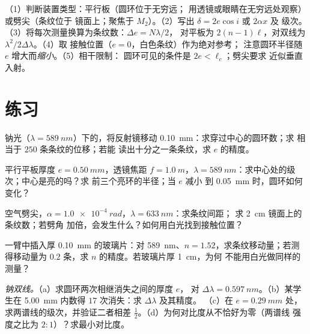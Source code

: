 \begin{method}[使用迈克耳孙干涉仪]\label{met:b2:michelson:method}
（1）判断装置类型：平行板（圆环位于无穷远；
用透镜或眼睛在无穷远处观察）或劈尖（条纹位于
镜面上；聚焦于 $M_2$）。（2）写出 $\delta = 2e\cos i$ 或 $2\alpha x$ 及
级次。（3）将每次测量换算为条纹数：$\Delta e = N\lambda/2$，
对平板为 $2(n - 1)\ell$，对双线为 $\lambda^2/2\Delta\lambda$。（4）取
接触位置（$e = 0$，白色条纹）作为绝对参考；
注意圆环半径随 $e$ 增大而\emph{缩小}。（5）相干限制：
圆环可见的条件是 $2e < \ell_c$；劈尖要求
近似垂直入射。
\end{method}

\section{练习}

\begin{exercise}[$\star$]\label{exo:b2:michelson:1}
钠光（$\lambda = \qty{589}{nm}$）下的，将反射镜移动
\qty{0.10}{mm}：求穿过中心的圆环数；求
相当于 $250$ 条条纹的位移；若能
读出十分之一条条纹，求 $e$ 的精度。
\end{exercise}

\begin{exercise}[$\star$]\label{exo:b2:michelson:2}
平行平板厚度 $e = \qty{0.50}{mm}$，透镜焦距 $f = \qty{1.0}{m}$，$\lambda =
\qty{589}{nm}$：求中心处的级次；中心是亮的吗？求
前三个亮环的半径；当 $e$ 减小
到 \qty{0.05}{mm} 时，圆环如何变化？
\end{exercise}

\begin{exercise}[$\star$]\label{exo:b2:michelson:3}
空气劈尖，$\alpha = \qty{1.0e-4}{rad}$，$\lambda = \qty{633}{nm}$：求条纹间距；
求 \qty{2}{cm} 镜面上的条纹数；若劈角
加倍，会发生什么？如何用白光找到接触位置？
\end{exercise}

\begin{exercise}[$\star$]\label{exo:b2:michelson:4}
一臂中插入厚 \qty{0.10}{mm} 的玻璃片：对
\qty{589}{nm}、$n = 1.52$，求条纹移动量；若测得移动量为 $0.2$ 条，求
$n$ 的精度。若玻璃片厚 \qty{1}{cm}，为何
不能用白光做同样的测量？
\end{exercise}

\begin{exercise}[$\star\star$]\label{exo:b2:michelson:5}
\emph{钠双线。}（a）求圆环两次相继消失之间的厚度 $e$，
对 $\Delta\lambda = \qty{0.597}{nm}$。（b）某学生在
\qty{5.00}{mm} 内数得 $17$ 次消失：求 $\Delta\lambda$ 及其精度。
（c）在 $e = \qty{0.29}{mm}$ 处，求两谱线的级次，并验证二者相差
$\tfrac12$。（d）为何对比度从不恰好为零（两谱线
强度之比为 $2 : 1$）？求最小对比度。
\end{exercise}

